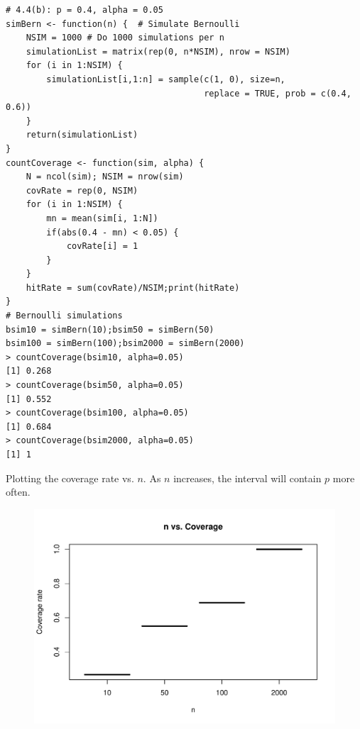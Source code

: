 \begin{lstlisting}[style=RSyntax, title=R]
# 4.4(b): p = 0.4, alpha = 0.05
simBern <- function(n) {  # Simulate Bernoulli
    NSIM = 1000 # Do 1000 simulations per n
    simulationList = matrix(rep(0, n*NSIM), nrow = NSIM)
    for (i in 1:NSIM) {
        simulationList[i,1:n] = sample(c(1, 0), size=n,
                                       replace = TRUE, prob = c(0.4, 0.6))
    }
    return(simulationList)
} 
countCoverage <- function(sim, alpha) {
    N = ncol(sim); NSIM = nrow(sim)
    covRate = rep(0, NSIM)
    for (i in 1:NSIM) {
        mn = mean(sim[i, 1:N])
        if(abs(0.4 - mn) < 0.05) {
            covRate[i] = 1 
        }
    } 
    hitRate = sum(covRate)/NSIM;print(hitRate)
} 
# Bernoulli simulations
bsim10 = simBern(10);bsim50 = simBern(50)
bsim100 = simBern(100);bsim2000 = simBern(2000)
> countCoverage(bsim10, alpha=0.05)
[1] 0.268
> countCoverage(bsim50, alpha=0.05)
[1] 0.552
> countCoverage(bsim100, alpha=0.05)
[1] 0.684
> countCoverage(bsim2000, alpha=0.05)
[1] 1
\end{lstlisting}
Plotting the coverage rate vs. $n$. As $n$ increases, the interval will contain $p$ more often.
\begin{figure}[H]
    \includegraphics[scale=0.54]{ch4_4.pdf}
\end{figure}

